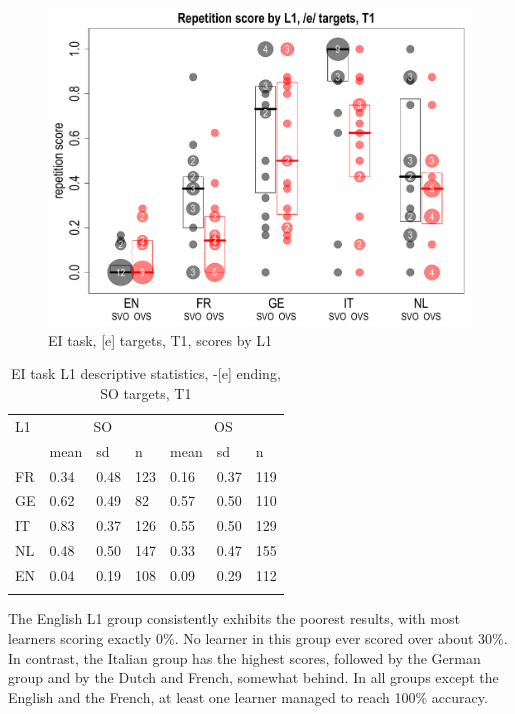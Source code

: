\begin{figure}
    \includegraphics[width=\textwidth]{figures/04-1.pdf}
    \caption{EI task, [e] targets, T1, scores by L1}
    \label{fig:04:1}
\end{figure}

\begin{table}
    \begin{tabularx}{\textwidth}{XXXXXXX}
    \lsptoprule
    L1 & \multicolumn{3}{c}{ SO} & \multicolumn{3}{c}{ OS}\\
    & mean & sd & n & mean & sd & n\\
    \cmidrule{2-7}
    FR & 0.34 & 0.48 & 123 & 0.16 & 0.37 & 119\\
    GE & 0.62 & 0.49 & 82 & 0.57 & 0.50 & 110\\
    IT & 0.83 & 0.37 & 126 & 0.55 & 0.50 & 129\\
    NL & 0.48 & 0.50 & 147 & 0.33 & 0.47 & 155\\
    EN & 0.04 & 0.19 & 108 & 0.09 & 0.29 & 112\\
    \lspbottomrule
    \end{tabularx}
    \caption{EI task L1 descriptive statistics, -[e] ending, SO targets, T1}
    \label{tab:04:1}
    \label{tab:03:1}
\end{table}

The English L1 group consistently exhibits the poorest results, with most learners scoring exactly 0\%. No learner in this group ever scored over about 30\%. In contrast, the Italian group has the highest scores, followed by the German group and by the Dutch and French, somewhat behind. In all groups except the English and the French, at least one learner managed to reach 100\% accuracy. 

